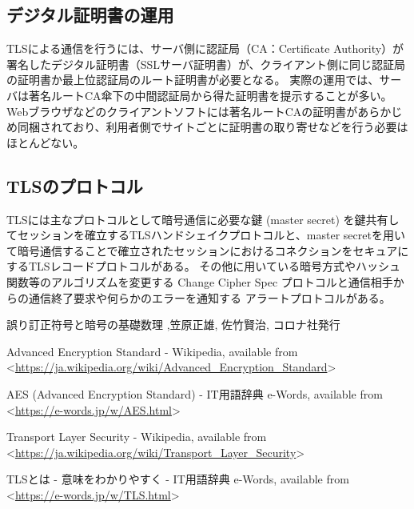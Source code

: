 \documentclass[dvipdfmx,autodetect-engine,titlepage]{jsarticle}
\begin{document}
\subsection{デジタル証明書の運用}
TLSによる通信を行うには、サーバ側に認証局（CA：Certificate Authority）が署名したデジタル証明書（SSLサーバ証明書）が、クライアント側に同じ認証局の証明書か最上位認証局のルート証明書が必要となる。
実際の運用では、サーバは著名ルートCA傘下の中間認証局から得た証明書を提示することが多い。Webブラウザなどのクライアントソフトには著名ルートCAの証明書があらかじめ同梱されており、利用者側でサイトごとに証明書の取り寄せなどを行う必要はほとんどない。\\

\subsection{TLSのプロトコル}
TLSには主なプロトコルとして暗号通信に必要な鍵 (master secret) を鍵共有してセッションを確立するTLSハンドシェイクプロトコルと、master secretを用いて暗号通信することで確立されたセッションにおけるコネクションをセキュアにするTLSレコードプロトコルがある。
その他に用いている暗号方式やハッシュ関数等のアルゴリズムを変更する Change Cipher Spec プロトコルと通信相手からの通信終了要求や何らかのエラーを通知する アラートプロトコルがある。\\

\begin{thebibliography}{99}

   誤り訂正符号と暗号の基礎数理 ,笠原正雄, 佐竹賢治, コロナ社発行

  Advanced Encryption Standard - Wikipedia,
  available from \textless\url{https://ja.wikipedia.org/wiki/Advanced_Encryption_Standard}\textgreater

  AES (Advanced Encryption Standard) - IT用語辞典 e-Words,
  available from \textless\url{https://e-words.jp/w/AES.html}\textgreater

  Transport Layer Security - Wikipedia,
  available from \textless\url{https://ja.wikipedia.org/wiki/Transport_Layer_Security}\textgreater

  TLSとは - 意味をわかりやすく - IT用語辞典 e-Words,
  available from \textless\url{https://e-words.jp/w/TLS.html}\textgreater


\end{thebibliography}
\end{document}
